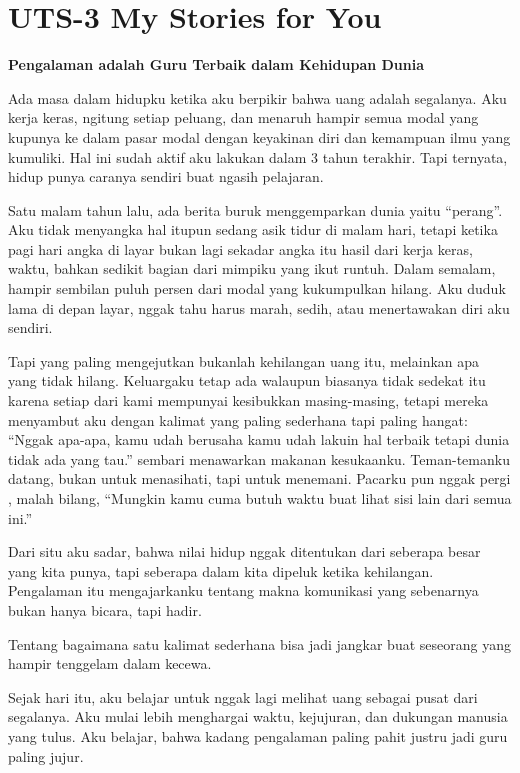 \documentclass[
  letterpaper,
  DIV=11,
  numbers=noendperiod]{scrreprt}
\begin{document}

\chapter{UTS-3 My Stories for You}\label{uts-3-my-stories-for-you}

\textbf{Pengalaman adalah Guru Terbaik dalam Kehidupan Dunia}

Ada masa dalam hidupku ketika aku berpikir bahwa uang adalah segalanya.
Aku kerja keras, ngitung setiap peluang, dan menaruh hampir semua modal
yang kupunya ke dalam pasar modal dengan keyakinan diri dan kemampuan
ilmu yang kumuliki. Hal ini sudah aktif aku lakukan dalam 3 tahun
terakhir. Tapi ternyata, hidup punya caranya sendiri buat ngasih
pelajaran.

Satu malam tahun lalu, ada berita buruk menggemparkan dunia yaitu
``perang''. Aku tidak menyangka hal itupun sedang asik tidur di malam
hari, tetapi ketika pagi hari angka di layar bukan lagi sekadar angka
itu hasil dari kerja keras, waktu, bahkan sedikit bagian dari mimpiku
yang ikut runtuh. Dalam semalam, hampir sembilan puluh persen dari modal
yang kukumpulkan hilang. Aku duduk lama di depan layar, nggak tahu harus
marah, sedih, atau menertawakan diri aku sendiri.

Tapi yang paling mengejutkan bukanlah kehilangan uang itu, melainkan apa
yang tidak hilang. Keluargaku tetap ada walaupun biasanya tidak sedekat
itu karena setiap dari kami mempunyai kesibukkan masing-masing, tetapi
mereka menyambut aku dengan kalimat yang paling sederhana tapi paling
hangat: ``Nggak apa-apa, kamu udah berusaha kamu udah lakuin hal terbaik
tetapi dunia tidak ada yang tau.'' sembari menawarkan makanan
kesukaanku. Teman-temanku datang, bukan untuk menasihati, tapi untuk
menemani. Pacarku pun nggak pergi , malah bilang, ``Mungkin kamu cuma
butuh waktu buat lihat sisi lain dari semua ini.''

Dari situ aku sadar, bahwa nilai hidup nggak ditentukan dari seberapa
besar yang kita punya, tapi seberapa dalam kita dipeluk ketika
kehilangan. Pengalaman itu mengajarkanku tentang makna komunikasi yang
sebenarnya bukan hanya bicara, tapi hadir.

Tentang bagaimana satu kalimat sederhana bisa jadi jangkar buat
seseorang yang hampir tenggelam dalam kecewa.

Sejak hari itu, aku belajar untuk nggak lagi melihat uang sebagai pusat
dari segalanya. Aku mulai lebih menghargai waktu, kejujuran, dan
dukungan manusia yang tulus. Aku belajar, bahwa kadang pengalaman paling
pahit justru jadi guru paling jujur.
\end{document}
